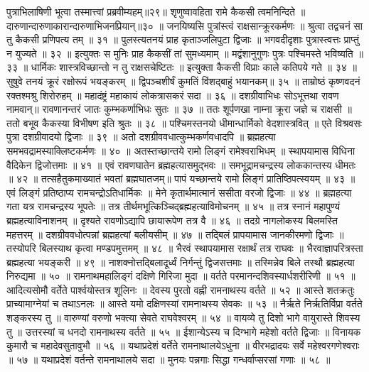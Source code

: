 पुत्राभिलाषिणी भूत्वा तस्मात्त्वां प्रब्रवीम्यहम्॥२९॥
शृणुष्वावहिता रामे कैकसी त्वमनिन्दिते ॥
दारुणान्दारुणाकारान्दारुणाभिजनप्रियान्॥३० ॥
जनयिष्यसि पुत्रांस्त्वं राक्षसान्क्रूरकर्मणः ॥
श्रुत्वा तद्वचनं सा तु कैकसी प्रणिपत्य तम् ॥ ३१ ॥
पुलस्त्यतनयं प्राह कृताञ्जलिपुटा द्विजाः ॥
भगवदीदृशाः पुत्रास्त्वत्तः प्राप्तुं न युज्यते ॥ ३२ ॥
इत्युक्तः स मुनिः प्राह कैकसीं तां सुमध्यमाम् ॥
मद्वंशानुगुणः पुत्रः पश्चिमस्ते भविष्यति ॥ ३३ ॥
धार्मिकः शास्त्रविच्छान्तो न तु राक्षसचेष्टितः ॥
इत्युक्ता कैकसी विप्राः काले कतिपये गते ॥ ३४ ॥
सुषुवे तनयं क्रूरं रक्षोरूपं भयङ्करम् ॥
द्विपञ्चशीर्षं कुमतिं विंशद्बाहुं भयानकम्॥ ३५ ॥
ताम्रोष्ठं कृष्णवदनं रक्तश्मश्रु शिरोरुहम् ॥
महादंष्ट्रं महाकायं लोकत्रासकरं सदा ॥ ३६ ॥
दशग्रीवाभिधः सोऽभूत्तथा रावण नामवान्॥
रावणानन्तरं जातः कुम्भकर्णाभिधः सुतः ॥ ३७ ॥
ततः शूर्पणखा नाम्ना क्रूरा जज्ञे च राक्षसी ॥
ततो बभूव कैकस्या विभीषण इति श्रुतः ॥ ३८ ॥
पश्चिमस्तनयो धीमान्धार्मिको वेदशास्त्रवित् ॥
एते विश्रवसः पुत्रा दशग्रीवादयो द्विजाः ॥ ३९ ॥
अतो दशग्रीववधात्कुम्भकर्णवधादपि ॥
ब्रह्महत्या समभवद्रामस्याक्लिष्टकर्मणः ॥ ४० ॥
अतस्तच्छान्तये रामो लिङ्गं रामेश्वराभिधम् ॥
स्थापयामास विधिना वैदिकेन द्विजोत्तमाः ॥ ४१ ॥
एवं रावणघातेन ब्रह्महत्यासमुद्भवः ॥
समभूद्रामचन्द्रस्य लोककान्तस्य धीमतः ॥ ४२ ॥
तत्सहैतुकमाख्यातं भवतां ब्रह्मघातजम्॥
पापं यच्छान्तये रामो लिङ्गं प्रातिष्ठिपत्स्वयम् ॥ ४३ ॥
एवं लिङ्गं प्रतिष्ठाप्य रामचन्द्रोऽतिधार्मिकः ॥
मेने कृतार्थमात्मानं ससीता वरजो द्विजाः ॥ ४४ ॥
ब्रह्महत्या गता यत्र रामचन्द्रस्य भूपतेः ॥
तत्र तीर्थमभूत्किञ्चिद्ब्रह्महत्याविमोचनम् ॥ ४५ ॥
तत्र स्नानं महापुण्यं ब्रह्महत्याविनाशनम् ॥
दृश्यते रावणोऽद्यापि छायारूपेण तत्र वै ॥ ४६ ॥
तदग्रे नागलोकस्य बिलमस्ति महत्तरम् ॥
दशग्रीववधोत्पन्नां ब्रह्महत्यां बलीयसीम् ॥ ४७ ॥
तद्बिलं प्रापयामास जानकीरमणो द्विजाः ॥
तस्योपरि बिलस्याथ कृत्वा मण्डपमुत्तमम् ॥ ४८ ॥
भैरवं स्थापयामास रक्षार्थं तत्र राघवः ॥
भैरवाज्ञापरित्रस्ता ब्रह्महत्या भयङ्करी ॥ ४९ ॥
नाशक्नोत्तद्बिलादूर्ध्वं निर्गन्तुं द्विजसत्तमाः ॥
तस्मिन्नेव बिले तस्थौ ब्रह्महत्या निरुद्यमा ॥ ५० ॥
रामनाथमहालिङ्गं दक्षिणे गिरिजा मुदा ॥
वर्तते परमानन्दशिवस्यार्धशरीरिणी ॥ ५१ ॥
आदित्यसोमौ वर्तेते पार्श्वयोस्तत्र शूलिनः ॥
देवस्य पुरतो वह्नी रामनाथस्य वर्तते ॥ ५२ ॥
आस्ते शतक्रतुः प्राच्यामाग्नेयां च तथाऽनलः ॥
आस्ते यमो दक्षिणस्यां रामनाथस्य सेवकः ॥ ५३ ॥
नैर्ऋते निर्ऋतिर्विप्रा वर्तते शङ्करस्य तु ॥
वारुण्यां वरुणो भक्त्या सेवते राघवेश्वरम् ॥ ५४ ॥
वायव्ये तु दिशो भागे वायुरास्ते शिवस्य तु ॥
उत्तरस्यां च धनदो रामनाथस्य वर्तते ॥ ५५ ॥
ईशान्येऽस्य च दिग्भागे महेशो वर्तते द्विजाः ॥
विनायक कुमारौ च महादेवसुतावुभौ ॥ ५६ ॥
यथाप्रदेशं वर्तेते रामनाथालयेऽधुना ॥
वीरभद्रादयः सर्वे महेश्वरगणेश्वराः ॥ ५७ ॥
यथाप्रदेशं वर्तन्ते रामनाथालये सदा ॥
मुनयः पन्नगाः सिद्धा गन्धर्वाप्सरसां गणाः ॥ ५८ ॥
